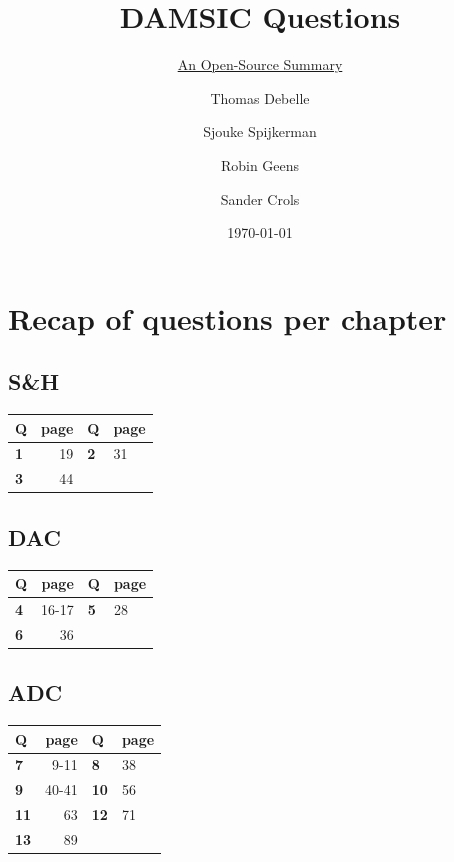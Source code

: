 \documentclass[
  a4paper,
]{article}
\title{DAMSIC Questions}
\subtitle{\href{https://github.com/Tfloow/Q8_KUL}{An Open-Source
Summary}}
\author{Thomas Debelle \and Sjouke Spijkerman \and Robin
Geens \and Sander Crols}
\date{\today}
\begin{document}
\maketitle

{
\setcounter{tocdepth}{3}
\tableofcontents
}
\hypertarget{recap-of-questions-per-chapter}{%
\section{Recap of questions per
chapter}\label{recap-of-questions-per-chapter}}

\hypertarget{sh}{%
\subsection{S\&H}\label{sh}}

\begin{longtable}[]{@{}lrll@{}}
\toprule\noalign{}
Q & page & Q & page \\
\midrule\noalign{}
\endhead
\bottomrule\noalign{}
\endlastfoot
\textbf{1} & 19 & \textbf{2} & 31 \\
\textbf{3} & 44 & & \\
\end{longtable}

\hypertarget{dac}{%
\subsection{DAC}\label{dac}}

\begin{longtable}[]{@{}lrll@{}}
\toprule\noalign{}
Q & page & Q & page \\
\midrule\noalign{}
\endhead
\bottomrule\noalign{}
\endlastfoot
\textbf{4} & 16-17 & \textbf{5} & 28 \\
\textbf{6} & 36 & & \\
\end{longtable}

\hypertarget{adc}{%
\subsection{ADC}\label{adc}}

\begin{longtable}[]{@{}lrll@{}}
\toprule\noalign{}
Q & page & Q & page \\
\midrule\noalign{}
\endhead
\bottomrule\noalign{}
\endlastfoot
\textbf{7} & 9-11 & \textbf{8} & 38 \\
\textbf{9} & 40-41 & \textbf{10} & 56 \\
\textbf{11} & 63 & \textbf{12} & 71 \\
\textbf{13} & 89 & & \\
\end{longtable}
\end{document}

